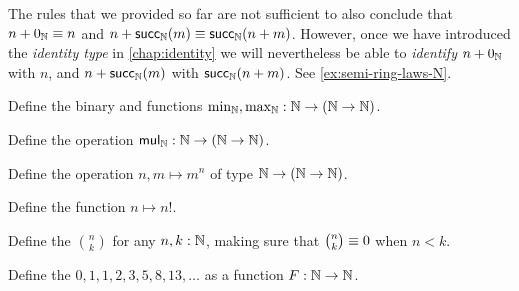 \begin{rmk}
The rules that we provided so far are not sufficient to also conclude that $n+0_{{\mathbb{N}}}\equiv n$ and $n+ \mathsf{succ}_{{\mathbb{N}}}(m)\equiv \mathsf{succ}_{{\mathbb{N}}}(n+m)$. However, once we have introduced the \emph{identity type} in \cref{chap:identity} we will nevertheless be able to \emph{identify} $n+0_{{\mathbb{N}}}$ with $n$, and $n+ \mathsf{succ}_{{\mathbb{N}}}(m)$ with $\mathsf{succ}_{{\mathbb{N}}}(n+m)$. See \cref{ex:semi-ring-laws-N}. 
\end{rmk}

\begin{exercises}
  \item Define the binary  and  functions $\min_{\mathbb{N}},\max_{\mathbb{N}}:{\mathbb{N}}\to({\mathbb{N}}\to{\mathbb{N}})$.
  \item Define the  operation $\mathsf{mul}_{\mathbb{N}} :{\mathbb{N}}\to({\mathbb{N}}\to{\mathbb{N}})$.
  \item Define the  operation $n,m\mapsto m^n$ of type ${\mathbb{N}}\to ({\mathbb{N}}\to {\mathbb{N}})$.
  \item Define the  function $n\mapsto n!$.
  \item Define the  $\binom{n}{k}$ for any $n,k:{\mathbb{N}}$, making sure that $\binom{n}{k}\equiv 0$ when $n<k$.
  \item Define the  $0,1,1,2,3,5,8,13,\ldots$ as a function $F:{\mathbb{N}}\to{\mathbb{N}}$.
\end{exercises}
